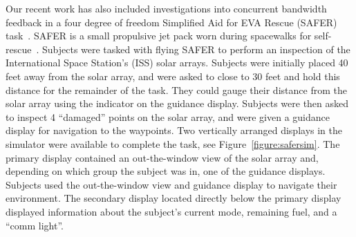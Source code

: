 \documentclass[float=false, crop=false]{standalone}
\begin{document}
Our recent work has also included investigations into concurrent bandwidth feedback in a four degree of freedom Simplified Aid for EVA Rescue (SAFER) task~\cite{Karasinski2016Masters, Karasinski2017}.
SAFER is a small propulsive jet pack worn during spacewalks for self-rescue~\cite{Vassigh1998}.
Subjects were tasked with flying SAFER to perform an inspection of the International Space Station's (ISS) solar arrays.
Subjects were initially placed 40 feet away from the solar array, and were asked to close to 30 feet and hold this distance for the remainder of the task.
They could gauge their distance from the solar array using the indicator on the guidance display.
Subjects were then asked to inspect 4 ``damaged'' points on the solar array, and were given a guidance display for navigation to the waypoints. %
Two vertically arranged displays in the simulator were available to complete the task, see Figure~\ref{figure:safersim}.
The primary display contained an out-the-window view of the solar array and, depending on which group the subject was in, one of the guidance displays. %
Subjects used the out-the-window view and guidance display to navigate their environment.
The secondary display located directly below the primary display displayed information about the subject's current mode, remaining fuel, and a ``comm light''.
\end{document}
